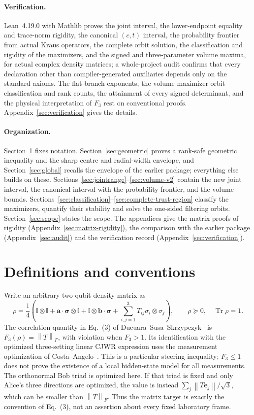 \documentclass[11pt,a4paper]{article}
\theoremstyle{remark}\newtheorem{remark}[theorem]{Remark}
\newcommand{\Tr}{\operatorname{Tr}}
\newcommand{\Id}{\mathbb I}
\newcommand{\norm}[1]{\left\lVert#1\right\rVert}
\newcommand{\bs}{\boldsymbol\sigma}
\renewcommand{\aa}{\mathbf a}\newcommand{\bb}{\mathbf b}
\begin{document}
\paragraph{Verification.} Lean~4.19.0 with Mathlib proves the joint
interval, the lower-endpoint equality and trace-norm rigidity, the
canonical $(c,t)$ interval, the probability frontier from actual Kraus
operators, the complete orbit solution, the classification and rigidity of
the maximizers, and the signed and three-parameter volume maxima, for
actual complex density matrices; a whole-project audit confirms that every
declaration other than compiler-generated auxiliaries depends only on the
standard axioms. The flat-branch
exponents, the volume-maximizer orbit classification and rank counts, the
attainment of every signed determinant, and the physical interpretation of
$F_3$ rest on conventional proofs. Appendix~\ref{sec:verification} gives
the details.

\paragraph{Organization.} Section~\ref{sec:defs} fixes notation.
Section~\ref{sec:geometric} proves a rank-safe geometric inequality and the
sharp centre and radial-width envelope, and Section~\ref{sec:global} recalls
the envelope of the earlier package; everything else builds on these.
Sections~\ref{sec:jointrange}--\ref{sec:volume-v2} contain the new joint
interval, the canonical interval with the probability frontier, and the
volume bounds. Sections~\ref{sec:classification}--\ref{sec:complete-trust-region}
classify the maximizers, quantify their stability and solve the one-sided
filtering orbits. Section~\ref{sec:scope} states the scope. The appendices
give the matrix proofs of rigidity (Appendix~\ref{sec:matrix-rigidity}), the
comparison with the earlier package (Appendix~\ref{sec:audit}) and the
verification record (Appendix~\ref{sec:verification}).

\section{Definitions and conventions}\label{sec:defs}
Write an arbitrary two-qubit density matrix as
\begin{equation}\label{eq:bloch}
\rho=\frac14\left(\Id\otimes\Id+\aa\cdot\bs\otimes\Id
+\Id\otimes\bb\cdot\bs+\sum_{i,j=1}^3T_{ij}\sigma_i\otimes\sigma_j\right),
\qquad \rho\succeq0,\quad\Tr\rho=1.
\end{equation}
The correlation quantity in Eq.~(3) of Ducuara--Susa--Skrzypczyk~\cite{ducuara}
is $F_3(\rho)=\norm T_F$, with violation when $F_3>1$. Its identification with
the optimized three-setting linear CJWR expression uses the measurement
optimization of Costa--Angelo~\cite{costa}. This is a particular steering
inequality; $F_3\leq1$ does not prove the existence of a local hidden-state
model for all measurements.
The orthonormal Bob triad is optimized here. If that triad is fixed and only
Alice's three directions are optimized, the value is instead
$\sum_j\norm{T\mathbf e_j}/\sqrt3$, which can be smaller than $\norm T_F$.
Thus the matrix target is exactly the convention of Eq.~(3), not an
assertion about every fixed laboratory frame.
\end{document}
